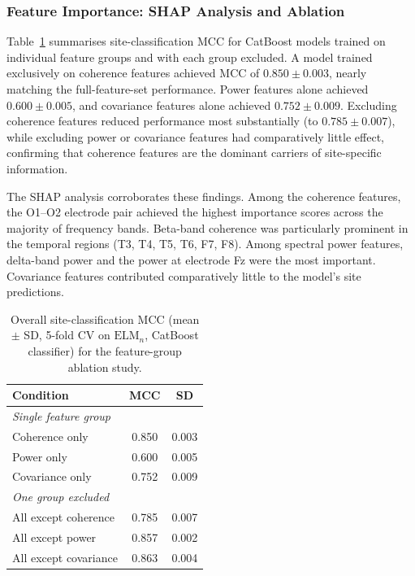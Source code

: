 \documentclass[preprint,12pt]{elsarticle}
\begin{document}
\subsubsection{Feature Importance: SHAP Analysis and Ablation}
\label{subsubsec:shap_results}

Table~\ref{tab:ablation} summarises site-classification MCC for
CatBoost models trained on individual feature groups and with each
group excluded.
A model trained exclusively on coherence features achieved MCC of
$0.850 \pm 0.003$, nearly matching the full-feature-set performance.
Power features alone achieved $0.600 \pm 0.005$, and covariance
features alone achieved $0.752 \pm 0.009$.
Excluding coherence features reduced performance most substantially
(to $0.785 \pm 0.007$), while excluding power or covariance features
had comparatively little effect, confirming that coherence features
are the dominant carriers of site-specific information.

The SHAP analysis corroborates these findings.
Among the coherence features, the O1--O2 electrode pair achieved the
highest importance scores across the majority of frequency bands.
Beta-band coherence was particularly prominent in the temporal regions
(T3, T4, T5, T6, F7, F8).
Among spectral power features, delta-band power and the power at
electrode Fz were the most important.
Covariance features contributed comparatively little to the model's
site predictions.

\begin{table}[htbp]
  \centering
  \caption{Overall site-classification MCC (mean $\pm$ SD, 5-fold CV
    on $\mathrm{ELM}_n$, CatBoost classifier) for the feature-group
    ablation study.}
  \label{tab:ablation}
  \begin{tabular}{lcc}
    \toprule
    \textbf{Condition} & \textbf{MCC} & \textbf{SD} \\
    \midrule
    \multicolumn{3}{l}{\textit{Single feature group}} \\
    \quad Coherence only  & 0.850 & 0.003 \\
    \quad Power only      & 0.600 & 0.005 \\
    \quad Covariance only & 0.752 & 0.009 \\
    \midrule
    \multicolumn{3}{l}{\textit{One group excluded}} \\
    \quad All except coherence  & 0.785 & 0.007 \\
    \quad All except power      & 0.857 & 0.002 \\
    \quad All except covariance & 0.863 & 0.004 \\
    \bottomrule
  \end{tabular}
\end{table}
\end{document}

